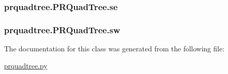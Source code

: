 \subsubsection[{se}]{\setlength{\rightskip}{0pt plus 5cm}prquadtree.\+P\+R\+Quad\+Tree.\+se}\label{classprquadtree_1_1PRQuadTree_acf5a1f668e9962b03120856564e0a3b0}
\subsubsection[{sw}]{\setlength{\rightskip}{0pt plus 5cm}prquadtree.\+P\+R\+Quad\+Tree.\+sw}\label{classprquadtree_1_1PRQuadTree_aee59816ff69872d39d406a103dd2e2f8}


The documentation for this class was generated from the following file\+:\begin{DoxyCompactItemize}
\item 
\hyperlink{prquadtree_8py}{prquadtree.\+py}\end{DoxyCompactItemize}
